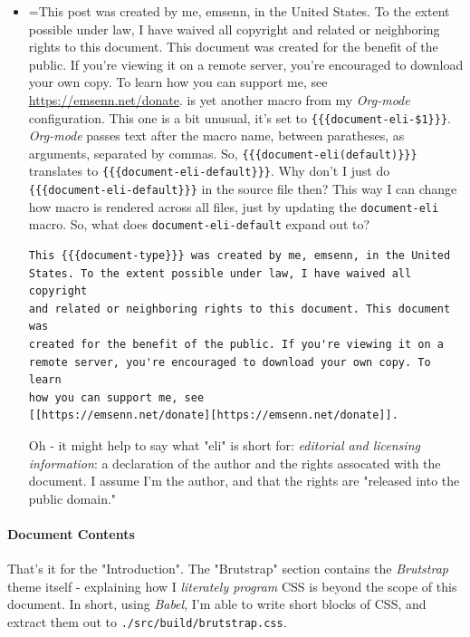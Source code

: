 \documentclass[11pt]{article}
\begin{document}
\begin{itemize}
what \emph{Brutstrap} is, how it's meant to look, and so on.
\item =This post was created by me, emsenn, in the United States. To the extent possible under law, I have waived all copyright and related or neighboring rights to this document. This document was created for the benefit of the public. If you're viewing it on a remote server, you're encouraged to download your own copy. To learn how you can support me, see \href{https://emsenn.net/donate}{https://emsenn.net/donate}. is yet another macro from my \emph{Org-mode}
configuration. This one is a bit unusual, it's set to
\texttt{\{\{\{document-eli-\$1\}\}\}}. \emph{Org-mode} passes text after the macro
name, between paratheses, as arguments, separated by commas. So,
\texttt{\{\{\{document-eli(default)\}\}\}} translates to
\texttt{\{\{\{document-eli-default\}\}\}}. Why don't I just do
\texttt{\{\{\{document-eli-default\}\}\}} in the source file then? This way I can
change how macro is rendered across all files, just by updating the
\texttt{document-eli} macro. So, what does \texttt{document-eli-default} expand
out to?
\begin{verbatim}
This {{{document-type}}} was created by me, emsenn, in the United
States. To the extent possible under law, I have waived all copyright
and related or neighboring rights to this document. This document was
created for the benefit of the public. If you're viewing it on a
remote server, you're encouraged to download your own copy. To learn
how you can support me, see
[[https://emsenn.net/donate][https://emsenn.net/donate]].
\end{verbatim}
Oh - it might help to say what "eli" is short for: \emph{editorial and
licensing information}: a declaration of the author and the rights
assocated with the document. I assume I'm the author, and that the
rights are "released into the public domain."
\end{itemize}
\paragraph*{Document Contents}
\label{sec:org8472732}
That's it for the "Introduction". The "Brutstrap" section contains the
\emph{Brutstrap} theme itself - explaining how I \emph{literately program} CSS
is beyond the scope of this document. In short, using \emph{Babel}, I'm
able to write short blocks of CSS, and extract them out to
\texttt{./src/build/brutstrap.css}.
\end{document}
